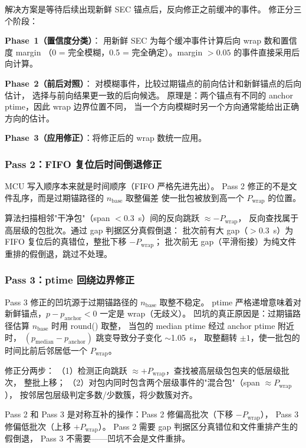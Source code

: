 \documentclass[aps,prd,twocolumn,nofootinbib,superscriptaddress]{revtex4-2}
\begin{document}
解决方案是等待后续出现新鲜 SEC 锚点后，反向修正之前缓冲的事件。
修正分三个阶段：

\textbf{Phase~1（置信度分类）}：
用新鲜 SEC 为每个缓冲事件计算后向 wrap 数和置信度 margin
（0 = 完全模糊，0.5 = 完全确定）。margin $> 0.05$ 的事件直接采用后向计算。

\textbf{Phase~2（前后对照）}：
对模糊事件，比较过期锚点的前向估计和新鲜锚点的后向估计，
选择与前向结果更一致的后向候选。
原理是：两个锚点有不同的 anchor ptime，因此 wrap 边界位置不同，
当一个方向模糊时另一个方向通常能给出正确方向的估计。

\textbf{Phase~3（应用修正）}：将修正后的 wrap 数统一应用。

\subsubsection{Pass 2：FIFO 复位后时间倒退修正}

MCU 写入顺序本来就是时间顺序（FIFO 严格先进先出）。
Pass 2 修正的不是文件乱序，而是过期锚路径的 $n_\mathrm{base}$ 取整偏差
使一批包被放到高一个 $P_\mathrm{wrap}$ 的位置。

算法扫描相邻"干净包"（span $< 0.3$~s）间的反向跳跃 $\approx -P_\mathrm{wrap}$，
反向查找属于高层级的包批次。通过 gap 判据区分真假倒退：
批次前有大 gap（$> 0.3$~s）为 FIFO 复位后的真错位，整批下移 $-P_\mathrm{wrap}$；
批次前无 gap（平滑衔接）为纯文件重排的假倒退，跳过不处理。

\subsubsection{Pass 3：ptime 回绕边界修正}

Pass 3 修正的凹坑源于过期锚路径的 $n_\mathrm{base}$ 取整不稳定。
ptime 严格递增意味着对新鲜锚点，$p - p_\mathrm{anchor} < 0$ 一定是 wrap（无歧义）。
凹坑的真正原因是：过期锚路径估算 $n_\mathrm{base}$ 时用 round() 取整，
当包的 median ptime 经过 anchor ptime 附近时，
$(p_\mathrm{median} - p_\mathrm{anchor})$ 跳变导致分子变化 $\sim$1.05~s，
取整翻转 $\pm 1$，使一批包的时间比前后邻居低一个 $P_\mathrm{wrap}$。

修正分两步：
（1）检测正向跳跃 $\approx +P_\mathrm{wrap}$，查找被高层级包包夹的低层级批次，
整批上移；
（2）对包内同时包含两个层级事件的"混合包"（span $\approx P_\mathrm{wrap}$），
按邻居包层级判定多数/少数簇，将少数簇对齐。

Pass 2 和 Pass 3 是对称互补的操作：Pass 2 修偏高批次（下移 $-P_\mathrm{wrap}$），
Pass 3 修偏低批次（上移 $+P_\mathrm{wrap}$）。
Pass 2 需要 gap 判据区分真错位和文件重排产生的假倒退，
Pass 3 不需要——凹坑不会是文件重排。
\end{document}
